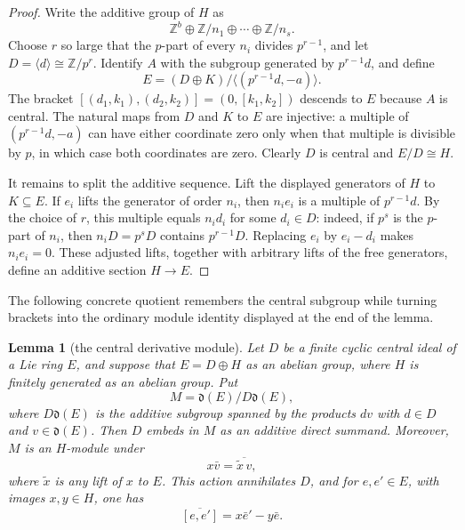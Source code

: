 \documentclass[10pt]{article}
\newtheorem{lemma}{Lemma}
\newcommand{\Z}{\mathbb Z}
\begin{document}
\begin{proof}
Write the additive group of $H$ as
\[
 \Z^b\oplus\Z/n_1\oplus\cdots\oplus\Z/n_s.
\]
Choose $r$ so large that the $p$-part of every $n_i$ divides $p^{r-1}$,
and let $D=\langle d\rangle\cong\Z/p^r$.  Identify $A$ with the subgroup
generated by $p^{r-1}d$, and define
\[
 E=(D\oplus K)/\langle(p^{r-1}d,-a)\rangle .            \tag{2}\label{eq:E}
\]
The bracket $[(d_1,k_1),(d_2,k_2)]=(0,[k_1,k_2])$ descends to $E$ because
$A$ is central.  The natural maps from $D$ and $K$ to $E$ are injective:
a multiple of $(p^{r-1}d,-a)$ can have either coordinate zero only when
that multiple is divisible by $p$, in which case both coordinates are zero.
Clearly $D$ is central and $E/D\cong H$.

It remains to split the additive sequence.  Lift the displayed generators
of $H$ to $K\subseteq E$.  If $e_i$ lifts the generator of order $n_i$,
then $n_i e_i$ is a multiple of $p^{r-1}d$.  By the choice of $r$, this
multiple equals $n_i d_i$ for some $d_i\in D$: indeed, if $p^s$ is the
$p$-part of $n_i$, then $n_iD=p^sD$ contains $p^{r-1}D$.  Replacing $e_i$
by $e_i-d_i$ makes $n_i e_i=0$.  These adjusted lifts, together with
arbitrary lifts of the free generators, define an additive section $H\to E$.
\end{proof}

The following concrete quotient remembers the central subgroup while turning
brackets into the ordinary module identity displayed at the end of the lemma.

\begin{lemma}[the central derivative module]\label{lem:central-module}
Let $D$ be a finite cyclic central ideal of a Lie ring $E$, and suppose that
$E=D\oplus H$ as an abelian group, where $H$ is finitely generated as an
abelian group.  Put
\[
 M=\mathfrak d(E)/D\mathfrak d(E),                       \tag{3}\label{eq:M}
\]
where $D\mathfrak d(E)$ is the additive subgroup spanned by the products
$dv$ with $d\in D$ and $v\in\mathfrak d(E)$.  Then $D$ embeds in $M$ as an
additive direct summand.  Moreover, $M$ is an $H$-module under
\[
 x\bar v=\overline{\widetilde x\,v},                   \tag{4}\label{eq:action}
\]
where $\widetilde x$ is any lift of $x$ to $E$.  This action annihilates
$D$, and for $e,e'\in E$, with images $x,y\in H$, one has
\[
                \overline{[e,e']}=x\bar e'-y\bar e.      \tag{5}\label{eq:derivative}
\]
\end{lemma}
\end{document}
